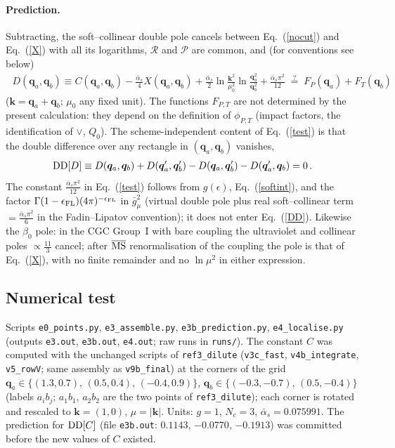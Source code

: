 \documentclass[11pt,a4paper]{article}
\renewcommand{\v}[1]{\bm{#1}}
\newcommand{\ab}{\bar\alpha_s}
\newcommand{\MSbar}{\overline{\rm MS}}
\begin{document}
\paragraph{Prediction.} Subtracting, the soft--collinear double pole cancels between Eq.~(\ref{nocut}) and Eq.~(\ref{X}) with all its logarithms, $\mathcal R$ and $\mathcal P$ are common, and (for conventions see below)
\begin{align}
\boxed{\;D(\v q_a,\v q_b)\equiv C(\v q_a,\v q_b)-\frac{\ab}{4}X(\v q_a,\v q_b)+\frac{\ab}{2}\ln\frac{\v k^2}{\mu_0^2}\ln\frac{\v q_a^2}{\v q_b^2}+\frac{\ab\pi^2}{12}\;\overset{?}{=}\;F_P(\v q_a)+F_T(\v q_b)\;}\label{test}
\end{align}
($\v k=\v q_a+\v q_b$; $\mu_0$ any fixed unit). The functions $F_{P,T}$ are not determined by the present calculation: they depend on the definition of $\phi_{P,T}$ (impact factors, the identification of $\vee$, $Q_0$). The scheme-independent content of Eq.~(\ref{test}) is that the double difference over any rectangle in $(\v q_a,\v q_b)$ vanishes,
\begin{align}
{\rm DD}[D]\equiv D(\v q_{a},\v q_{b})+D(\v q_{a}',\v q_{b}')-D(\v q_{a},\v q_{b}')-D(\v q_{a}',\v q_{b})=0\,.\label{DD}
\end{align}
The constant $\frac{\ab\pi^2}{12}$ in Eq.~(\ref{test}) follows from $g(\epsilon)$, Eq.~(\ref{softint}), and the factor $\Gamma(1-\epsilon_{\rm FL})(4\pi)^{-\epsilon_{\rm FL}}$ in $\bar g_\mu^2$ (virtual double pole plus real soft--collinear term $=\frac{\ab\pi^2}{6}$ in the Fadin--Lipatov convention); it does not enter Eq.~(\ref{DD}). Likewise the $\beta_0$ pole: in the CGC Group~I with bare coupling the ultraviolet and collinear poles $\propto\frac{11}{3}$ cancel; after $\MSbar$ renormalisation of the coupling the pole is that of Eq.~(\ref{X}), with no finite remainder and no $\ln\mu^2$ in either expression.

\subsection{Numerical test}
Scripts \texttt{e0\_points.py}, \texttt{e3\_assemble.py}, \texttt{e3b\_prediction.py}, \texttt{e4\_localise.py} (outputs \texttt{e3.out}, \texttt{e3b.out}, \texttt{e4.out}; raw runs in \texttt{runs/}). The constant $C$ was computed with the unchanged scripts of \texttt{ref3\_dilute} (\texttt{v3c\_fast}, \texttt{v4b\_integrate}, \texttt{v5\_rowV}; same assembly as \texttt{v9b\_final}) at the corners of the grid $\v q_a\in\{(1.3,0.7),\,(0.5,0.4),\,(-0.4,0.9)\}$, $\v q_b\in\{(-0.3,-0.7),\,(0.5,-0.4)\}$ (labels $a_ib_j$; $a_1b_1$, $a_2b_2$ are the two points of \texttt{ref3\_dilute}); each corner is rotated and rescaled to $\v k=(1,0)$, $\mu=|\v k|$. Units: $g=1$, $N_c=3$, $\ab=0.075991$. The prediction for ${\rm DD}[C]$ (file \texttt{e3b.out}: $0.1143$, $-0.0770$, $-0.1913$) was committed before the new values of $C$ existed.
\end{document}
